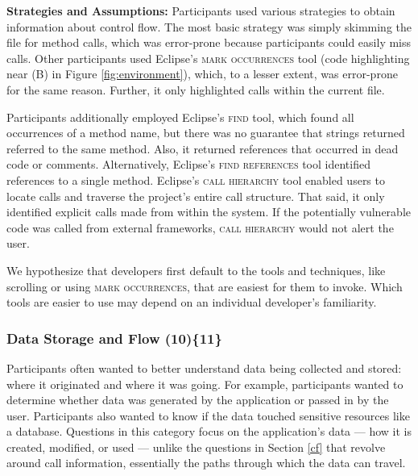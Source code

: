 \documentclass[10pt,journal,compsoc]{IEEEtran}
\begin{document}
\textbf{Strategies and Assumptions:}
Participants used various strategies to obtain information about control flow.
The most basic strategy was simply skimming the file for method calls, which was error-prone because participants could easily miss calls.
Other participants used Eclipse's \textsc{mark occurrences} tool (code highlighting near (B) in Figure \ref{fig:environment}), which, to a lesser extent, was error-prone for the same reason. 
Further, it only highlighted calls within the current file.

Participants additionally employed Eclipse's \textsc{find} tool, which found all occurrences of a method name, but there was no guarantee that strings returned referred to the same method.
Also, it returned references that occurred in dead code or comments.
Alternatively, Eclipse's \textsc{find references} tool identified references to a single method.
Eclipse's \textsc{call hierarchy} tool enabled users to locate calls and traverse the project's entire call structure.
That said, it only identified explicit calls made from within the system. 
If the potentially vulnerable code was called from external frameworks, \textsc{call hierarchy} would not alert the user.

We hypothesize that developers first default to the tools and techniques, like scrolling or using \textsc{mark occurrences}, that are easiest for them to invoke.
Which tools are easier to use may depend on an individual developer's familiarity.

%	
%


\subsubsection{Data Storage and Flow (10)\{11\}}\label{dsf}

Participants often wanted to better understand data being collected and stored: where it originated and where it was going. 
For example, participants wanted to determine whether data was generated by the application or passed in by the user. 
Participants also wanted to know if the data touched sensitive resources like a database.
Questions in this category focus on the application's data --- how it is created, modified, or used --- unlike the questions in Section \ref{cf} that revolve around call information, essentially the paths through which the data can travel.
\\
\end{document}
